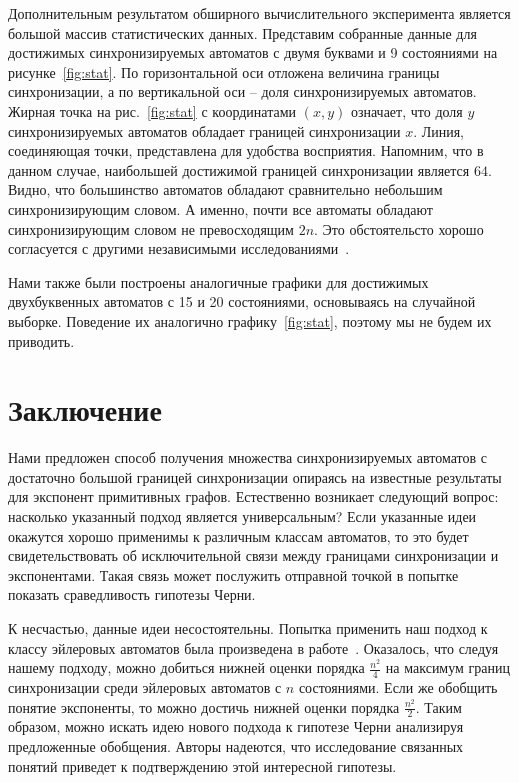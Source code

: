 \documentclass[11pt]{article}
\begin{document}
Дополнительным результатом обширного вычислительного эксперимента является большой массив 
статистических данных. Представим собранные данные для достижимых синхронизируемых автоматов 
с двумя буквами и 9 состояниями на рисунке~\ref{fig:stat}. По горизонтальной оси отложена 
величина границы синхронизации, а по вертикальной оси -- доля синхронизируемых автоматов.
Жирная точка на рис.~\ref{fig:stat} с координатами $(x,y)$ означает, что доля $y$ синхронизируемых
автоматов обладает границей синхронизации $x$. Линия, соединяющая точки, представлена для
удобства восприятия. Напомним, что в данном случае, наибольшей достижимой границей
синхронизации является $64$. Видно, что большинство автоматов обладают сравнительно небольшим
синхронизирующим словом. А именно, почти все автоматы обладают синхронизирующим словом
не превосходящим $2n$. Это обстоятельсто хорошо согласуется с другими независимыми 
исследованиями~\cite{Tr11, ST}.

Нами также были построены аналогичные графики для достижимых двухбуквенных автоматов с 15 и 20
состояниями, основываясь на случайной выборке. Поведение их аналогично графику~\ref{fig:stat},
поэтому мы не будем их приводить.

\section{Заключение}
Нами предложен способ получения множества синхронизируемых автоматов с достаточно большой
границей синхронизации опираясь на известные результаты для экспонент примитивных графов.
Естественно возникает следующий вопрос: насколько указанный подход является универсальным?
Если указанные идеи окажутся хорошо применимы к различным классам автоматов, то это будет
свидетельствовать об исключительной связи между границами синхронизации и экспонентами.
Такая связь может послужить отправной точкой в попытке показать сраведливость гипотезы
Черни.

К несчастью, данные идеи несостоятельны. Попытка применить наш подход к классу эйлеровых 
автоматов была произведена в работе~\cite{Gu11}. Оказалось, что следуя нашему подходу,
можно добиться нижней оценки порядка $\frac{n^2}{4}$ на максимум границ синхронизации
среди эйлеровых автоматов с $n$ состояниями. Если же обобщить понятие экспоненты, то
можно достичь нижней оценки порядка $\frac{n^2}{2}$. Таким образом, можно искать
идею нового подхода к гипотезе Черни анализируя предложенные обобщения. Авторы надеются,
что исследование связанных понятий приведет к подтверждению этой интересной гипотезы.
\end{document}
